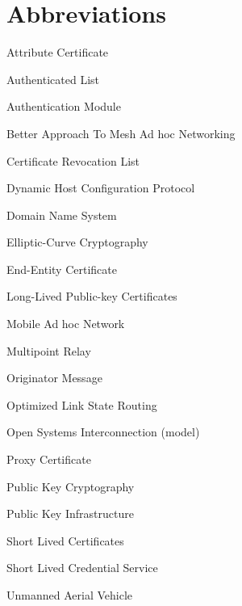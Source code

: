 \chapter*{Abbreviations}

\begin{acronym}

 {Attribute Certificate}

 {Authenticated List} %

 {Authentication Module} %

 {Better Approach To Mesh Ad hoc Networking}

 {Certificate Revocation List}

 {Dynamic Host Configuration Protocol}

 {Domain Name System}


 {Elliptic-Curve Cryptography}

 {End-Entity Certificate}

 {Long-Lived Public-key Certificates}

 {Mobile Ad hoc Network}

 {Multipoint Relay}

 {Originator Message}

 {Optimized Link State Routing}

 {Open Systems Interconnection (model)}

 {Proxy Certificate}

 {Public Key Cryptography}

 {Public Key Infrastructure}

 {Short Lived Certificates}

 {Short Lived Credential Service}

 {Unmanned Aerial Vehicle}



\end{acronym}
